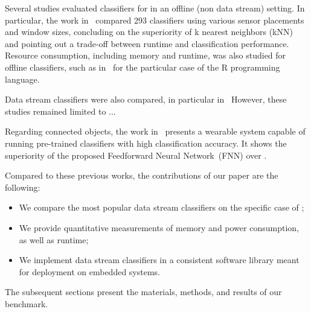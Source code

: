 
Several studies evaluated classifiers for \har in an
offline (non data stream) setting. In particular, the work
in~\cite{Janidarmian_2017} compared 293 classifiers using various sensor
placements and window sizes, concluding on the superiority of k nearest
neighbors (kNN) and pointing out a trade-off between runtime and
classification performance. Resource consumption, including memory and runtime, was also studied 
for offline classifiers, such as in~\cite{memory_consumption_machine_learning}
for the particular case of the R programming language.

Data stream classifiers were also compared, in particular
in~
However, these studies remained limited to ... 

Regarding connected objects, the work in~\cite{omid_2019} presents a
wearable system capable of running pre-trained classifiers  with high classification accuracy. It shows
the superiority of the proposed Feedforward Neural
Network~(FNN) over \knn. 

Compared to these previous works, the contributions of our paper are the following:
\begin{itemize}
    \item We compare the most popular data stream classifiers on the specific case of \har;
    \item We provide quantitative measurements of memory and power consumption, as well as runtime;
    \item We implement data stream classifiers in a consistent software library meant for deployment on embedded systems.
\end{itemize} 
The subsequent sections present the materials, methods, and results of our benchmark.


